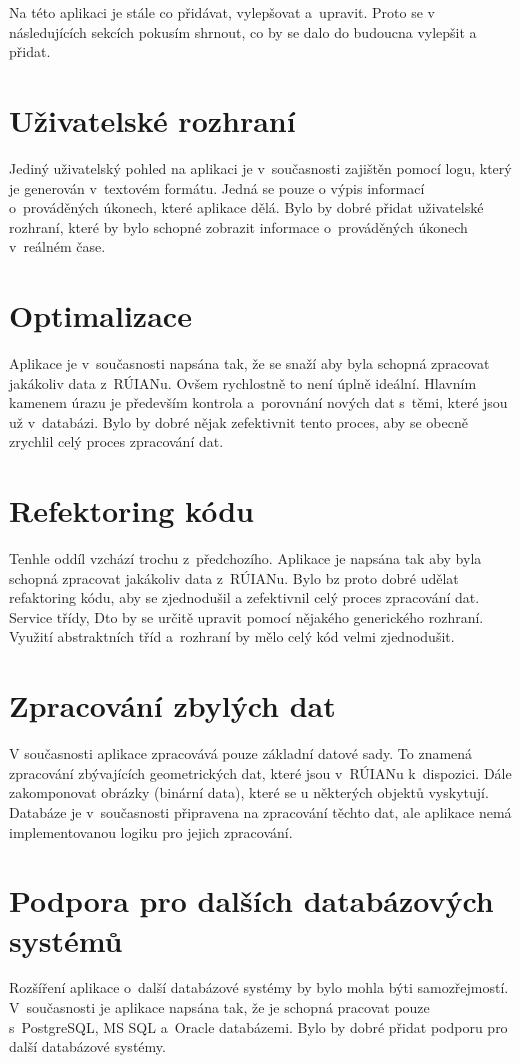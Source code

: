 Na této aplikaci je stále co přidávat, vylepšovat a~upravit.
Proto se v následujících sekcích pokusím shrnout, co by se 
dalo do budoucna vylepšit a přidat.

\section*{Uživatelské rozhraní}
Jediný uživatelský pohled na aplikaci je v~současnosti zajištěn pomocí 
logu, který je generován v~textovém formátu. Jedná se pouze o výpis
informací o~prováděných úkonech, které aplikace dělá.
Bylo by dobré přidat uživatelské rozhraní, které by bylo schopné
zobrazit informace o~prováděných úkonech v~reálném čase.


\section*{Optimalizace}
Aplikace je v~současnosti napsána tak, že se snaží aby byla schopná
zpracovat jakákoliv data z~RÚIANu. Ovšem rychlostně to není
úplně ideální. Hlavním kamenem úrazu je především kontrola
a~porovnání nových dat s~těmi, které jsou už v~databázi.
Bylo by dobré nějak zefektivnit tento proces, aby se obecně zrychlil
celý proces zpracování dat.

\section*{Refektoring kódu}
Tenhle oddíl vzchází trochu z~předchozího. Aplikace je napsána
tak aby byla schopná zpracovat jakákoliv data z~RÚIANu.
Bylo bz proto dobré udělat refaktoring kódu, aby se zjednodušil
a zefektivnil celý proces zpracování dat. Service třídy, Dto 
by se určitě upravit pomocí nějakého generického rozhraní.
Využití abstraktních tříd a~rozhraní by mělo celý kód velmi
zjednodušit.

\section*{Zpracování zbylých dat}
V současnosti aplikace zpracovává pouze základní datové sady.
To znamená zpracování zbývajících geometrických dat, které jsou
v~RÚIANu k~dispozici. Dále zakomponovat obrázky (binární data),
které se u některých objektů vyskytují.
Databáze je v~současnosti připravena na zpracování těchto dat,
ale aplikace nemá implementovanou logiku pro jejich zpracování.

\section*{Podpora pro dalších databázových systémů}
Rozšíření aplikace o~další databázové systémy by bylo mohla
býti samozřejmostí. V~současnosti je aplikace napsána tak,
že je schopná pracovat pouze s~PostgreSQL, MS SQL a~Oracle databázemi.
Bylo by dobré přidat podporu pro další databázové systémy.